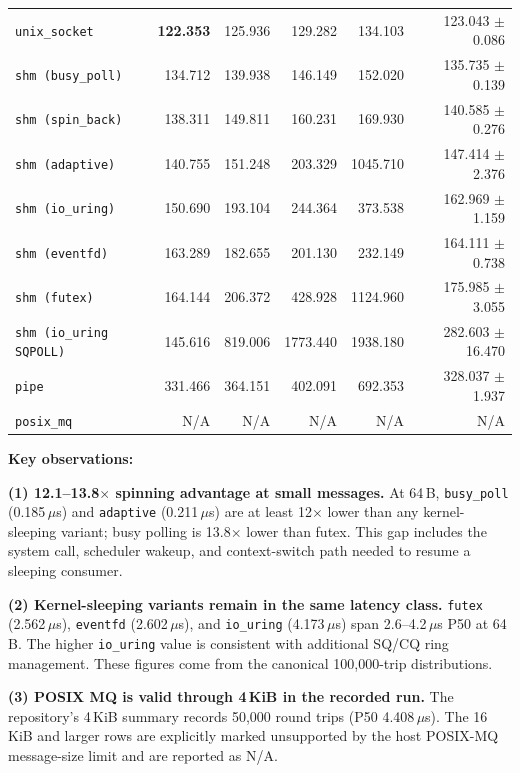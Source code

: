 \documentclass[10pt,conference]{IEEEtran}
\begin{document}
\begin{table}[!t]
{\begin{tabular}{@{}lrrrrr@{}}
    \texttt{unix\_socket}     & \textbf{122.353} & 125.936 & 129.282 & 134.103 & 123.043 $\pm$ 0.086 \\
    \texttt{shm (busy\_poll)} & 134.712          & 139.938 & 146.149 & 152.020 & 135.735 $\pm$ 0.139 \\
    \texttt{shm (spin\_back)} & 138.311          & 149.811 & 160.231 & 169.930 & 140.585 $\pm$ 0.276 \\
    \texttt{shm (adaptive)}   & 140.755          & 151.248 & 203.329 & 1045.710 & 147.414 $\pm$ 2.376 \\
    \texttt{shm (io\_uring)}  & 150.690          & 193.104 & 244.364 & 373.538 & 162.969 $\pm$ 1.159 \\
    \texttt{shm (eventfd)}    & 163.289          & 182.655 & 201.130 & 232.149 & 164.111 $\pm$ 0.738 \\
    \texttt{shm (futex)}      & 164.144          & 206.372 & 428.928 & 1124.960 & 175.985 $\pm$ 3.055 \\
    \texttt{shm (io\_uring SQPOLL)} & 145.616 & 819.006 & 1773.440 & 1938.180 & 282.603 $\pm$ 16.470 \\
    \texttt{pipe}             & 331.466          & 364.151 & 402.091 & 692.353 & 328.037 $\pm$ 1.937 \\
    \texttt{posix\_mq}        & N/A              & N/A     & N/A     & N/A     & N/A \\
    \bottomrule
  \end{tabular}}
\end{table}

\textbf{Key observations:}

\textbf{(1) 12.1--13.8$\times$ spinning advantage at small messages.}
At 64\,B, \texttt{busy\_poll} (0.185\,$\mu$s) and \texttt{adaptive}
(0.211\,$\mu$s) are at least 12$\times$ lower than any kernel-sleeping variant;
busy polling is 13.8$\times$ lower than futex. This
gap includes the system call, scheduler wakeup, and context-switch path needed
to resume a sleeping consumer.

\textbf{(2) Kernel-sleeping variants remain in the same latency class.}
\texttt{futex} (2.562\,$\mu$s), \texttt{eventfd} (2.602\,$\mu$s), and
\texttt{io\_uring} (4.173\,$\mu$s) span 2.6--4.2\,$\mu$s P50 at 64\,B.
The higher \texttt{io\_uring} value is consistent with additional SQ/CQ ring
management. These figures come from the canonical 100,000-trip distributions.

\textbf{(3) POSIX MQ is valid through 4\,KiB in the recorded run.}
The repository's 4\,KiB summary records 50,000 round trips (P50 4.408\,$\mu$s).
The 16\,KiB and larger rows are explicitly marked unsupported by the host
POSIX-MQ message-size limit and are reported as N/A.
\end{document}
